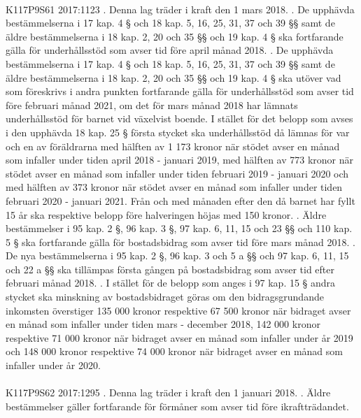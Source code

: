 \documentclass[a4paper,notitlepage,openany,10pt]{book}
\begin{document}
\paragraph*{}
{\tiny K117P9S61}
2017:1123
. Denna lag träder i kraft den 1 mars 2018.
. De upphävda bestämmelserna i 17 kap. 4 § och 18 kap. 5, 16, 25, 31, 37 och 39 §§ samt de äldre bestämmelserna i 18 kap. 2, 20 och 35 §§ och 19 kap. 4 § ska fortfarande gälla för underhållsstöd som avser tid före april månad 2018.
. De upphävda bestämmelserna i 17 kap. 4 § och 18 kap. 5, 16, 25, 31, 37 och 39 §§ samt de äldre bestämmelserna i 18 kap. 2, 20 och 35 §§ och 19 kap. 4 § ska utöver vad som föreskrivs i andra punkten fortfarande gälla för underhållsstöd som avser tid före februari månad 2021, om det för mars månad 2018 har lämnats underhållsstöd för barnet vid växelvist boende. I stället för det belopp som avses i den upphävda 18 kap. 25 § första stycket ska underhållsstöd då lämnas för var och en av föräldrarna med hälften av 1 173 kronor när stödet avser en månad som infaller under tiden april 2018 - januari 2019, med hälften av 773 kronor när stödet avser en månad som infaller under tiden februari 2019 - januari 2020 och med hälften av 373 kronor när stödet avser en månad som infaller under tiden februari 2020 - januari 2021. Från och med månaden efter den då barnet har fyllt 15 år ska respektive belopp före halveringen höjas med 150 kronor.
. Äldre bestämmelser i 95 kap. 2 §, 96 kap. 3 §, 97 kap. 6, 11, 15 och 23 §§ och 110 kap. 5 § ska fortfarande gälla för bostadsbidrag som avser tid före mars månad 2018.
. De nya bestämmelserna i 95 kap. 2 §, 96 kap. 3 och 5 a §§ och 97 kap. 6, 11, 15 och 22 a §§ ska tillämpas första gången på bostadsbidrag som avser tid efter februari månad 2018.
. I stället för de belopp som anges i 97 kap. 15 § andra stycket ska minskning av bostadsbidraget göras om den bidragsgrundande inkomsten överstiger 135 000 kronor respektive 67 500 kronor när bidraget avser en månad som infaller under tiden mars - december 2018, 142 000 kronor respektive 71 000 kronor när bidraget avser en månad som infaller under år 2019 och 148 000 kronor respektive 74 000 kronor när bidraget avser en månad som infaller under år 2020.
\paragraph*{}
{\tiny K117P9S62}
2017:1295
. Denna lag träder i kraft den 1 januari 2018.
. Äldre bestämmelser gäller fortfarande för förmåner som avser tid före ikraftträdandet.
\end{document}
